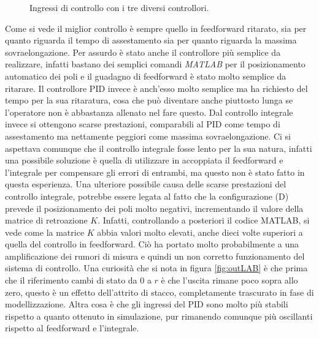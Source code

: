 		\begin{figure}[H]
			\centering
			 
			\caption{Ingressi di controllo con i tre diversi controllori.}
			\label{fig:inLAB}		
		\end{figure}		
		
		\noindent Come si vede il miglior controllo è sempre quello in feedforward ritarato, sia per quanto riguarda il tempo di assestamento sia per quanto riguarda la massima sovraelongazione. Per assurdo è stato anche il controllore più semplice da realizzare, infatti bastano dei semplici comandi \textit{MATLAB} per il posizionamento automatico dei poli e il guadagno di feedforward è stato molto semplice da ritarare. Il controllore PID invece è anch'esso molto semplice ma ha richiesto del tempo per la sua ritaratura, cosa che può diventare anche piuttosto lunga se l'operatore non è abbastanza allenato nel fare questo. Dal controllo integrale invece si ottengono scarse prestazioni, comparabili al PID come tempo di assestamento ma nettamente peggiori come massima sovraelongazione. Ci si aspettava comunque che il controllo integrale fosse lento per la sua natura, infatti una possibile soluzione è quella di utilizzare in accoppiata il feedforward e l'integrale per compensare gli errori di entrambi, ma questo non è stato fatto in questa esperienza. Una ulteriore possibile causa delle scarse prestazioni del controllo integrale, potrebbe essere legata al fatto che la configurazione (D) prevede il posizionamento dei poli molto negativi, incrementando il valore della matrice di retroazione $K$. Infatti, controllando a posteriori il codice MATLAB, si vede come la matrice $K$ abbia valori molto elevati, anche dieci volte superiori a quella del controllo in feedforward. Ciò ha portato molto probabilmente a una amplificazione dei rumori di misura e quindi un non corretto funzionamento del sistema di controllo. Una curiosità che si nota in figura \ref{fig:outLAB} è che prima che il riferimento cambi di stato da $0$ a $r$ è che l'uscita rimane poco sopra allo zero, questo è un effetto dell'attrito di stacco, completamente trascurato in fase di modellizzazione. Altra cosa è che gli ingressi del PID sono molto più stabili rispetto a quanto ottenuto in simulazione, pur rimanendo comunque più oscillanti rispetto al feedforward e l'integrale. \newline
		
